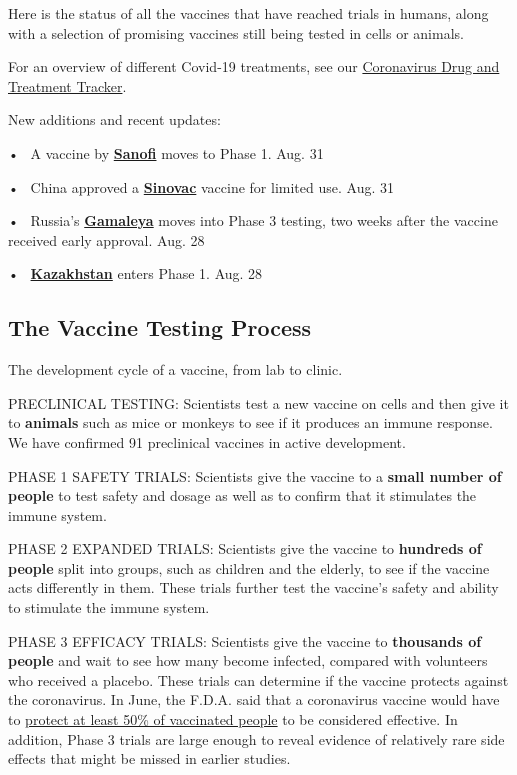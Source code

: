 Here is the status of all the vaccines that have reached trials in
humans, along with a selection of promising vaccines still being tested
in cells or animals.

For an overview of different Covid-19 treatments, see our
\href{https://www.nytimes3xbfgragh.onion/interactive/2020/science/coronavirus-drugs-treatments.html}{Coronavirus
Drug and Treatment Tracker}.

New additions and recent updates:

•~ A vaccine by \textbf{\protect\hyperlink{sanofi2}{Sanofi}} moves to
Phase 1. Aug. 31

•~ China approved a \textbf{\protect\hyperlink{sinovac}{Sinovac}}
vaccine for limited use. Aug. 31

•~ Russia's \textbf{\protect\hyperlink{gamaleya}{Gamaleya}} moves into
Phase 3 testing, two weeks after the vaccine received early approval.
Aug. 28

•~ \textbf{\protect\hyperlink{kazakhstan}{Kazakhstan}} enters Phase 1.
Aug. 28

\hypertarget{the-vaccine-testing-process}{%
\subsection{The Vaccine Testing
Process}\label{the-vaccine-testing-process}}

The development cycle of a vaccine, from lab to clinic.

PRECLINICAL TESTING: Scientists test a new vaccine on cells and then
give it to \textbf{animals} such as mice or monkeys to see if it
produces an immune response. We have confirmed 91 preclinical vaccines
in active development.

PHASE 1 SAFETY TRIALS: Scientists give the vaccine to a \textbf{small
number of people} to test safety and dosage as well as to confirm that
it stimulates the immune system.

PHASE 2 EXPANDED TRIALS: Scientists give the vaccine to \textbf{hundreds
of people} split into groups, such as children and the elderly, to see
if the vaccine acts differently in them. These trials further test the
vaccine's safety and ability to stimulate the immune system.

PHASE 3 EFFICACY TRIALS: Scientists give the vaccine to
\textbf{thousands of people} and wait to see how many become infected,
compared with volunteers who received a placebo. These trials can
determine if the vaccine protects against the coronavirus. In June, the
F.D.A. said that a coronavirus vaccine would have to
\href{https://www.fda.gov/news-events/press-announcements/coronavirus-covid-19-update-fda-takes-action-help-facilitate-timely-development-safe-effective-covid}{protect
at least 50\% of vaccinated people} to be considered effective. In
addition, Phase 3 trials are large enough to reveal evidence of
relatively rare side effects that might be missed in earlier studies.


